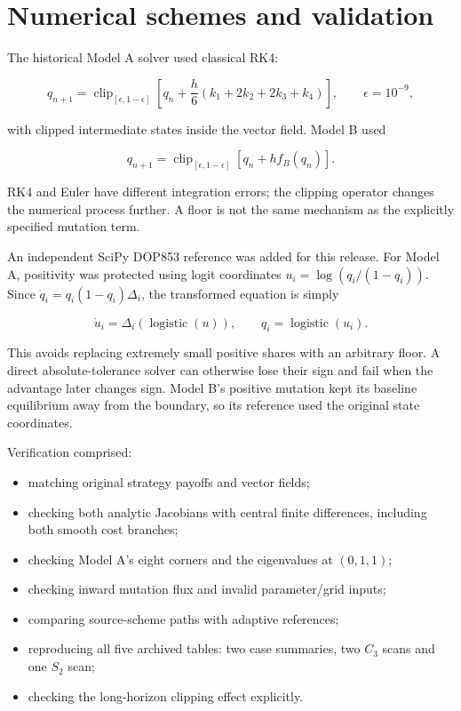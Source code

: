 \documentclass[
  11pt,
  letterpaper,
]{article}
\providecommand{\tightlist}{%
  \setlength{\itemsep}{0pt}\setlength{\parskip}{0pt}}
\begin{document}
\section{Numerical schemes and
validation}\label{numerical-schemes-and-validation}

The historical Model A solver used classical RK4:

\[q_{n+1}=\operatorname{clip}_{[\epsilon,1-\epsilon]}
\left[q_n+\frac h6(k_1+2k_2+2k_3+k_4)\right],\qquad \epsilon=10^{-9},\]

with clipped intermediate states inside the vector field. Model B used

\[q_{n+1}=\operatorname{clip}_{[\epsilon,1-\epsilon]}[q_n+h f_B(q_n)].\]

RK4 and Euler have different integration errors; the clipping operator
changes the numerical process further. A floor is not the same mechanism
as the explicitly specified mutation term.

An independent SciPy DOP853 reference was added for this release. For
Model A, positivity was protected using logit coordinates
\(u_i=\log(q_i/(1-q_i))\). Since \(\dot q_i=q_i(1-q_i)\Delta_i\), the
transformed equation is simply

\[\dot u_i=\Delta_i(\operatorname{logistic}(u)),\qquad q_i=\operatorname{logistic}(u_i).\]

This avoids replacing extremely small positive shares with an arbitrary
floor. A direct absolute-tolerance solver can otherwise lose their sign
and fail when the advantage later changes sign. Model B's positive
mutation kept its baseline equilibrium away from the boundary, so its
reference used the original state coordinates.

Verification comprised:

\begin{itemize}
\tightlist
\item
  matching original strategy payoffs and vector fields;
\item
  checking both analytic Jacobians with central finite differences,
  including both smooth cost branches;
\item
  checking Model A's eight corners and the eigenvalues at \((0,1,1)\);
\item
  checking inward mutation flux and invalid parameter/grid inputs;
\item
  comparing source-scheme paths with adaptive references;
\item
  reproducing all five archived tables: two case summaries, two \(C_3\)
  scans and one \(S_2\) scan;
\item
  checking the long-horizon clipping effect explicitly.
\end{itemize}
\end{document}
